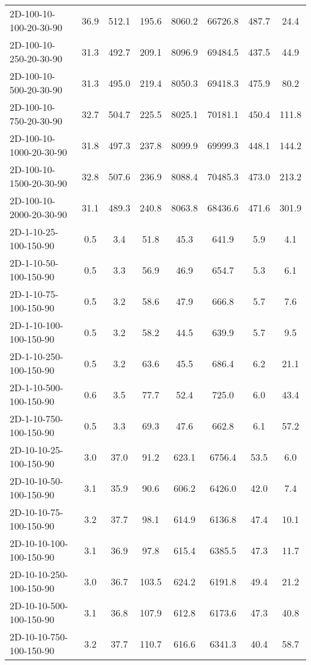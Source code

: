 \documentclass{article}
\begin{document}
\begin{center}
\begin{table}[h]
\begin{tabular}{|l||c|c|c|c|c|c|c|}
        2D-100-10-100-20-30-90 & 36.9 & 512.1 & 195.6 & 8060.2 & 66726.8 & 487.7 & 24.4 \\
        2D-100-10-250-20-30-90 & 31.3 & 492.7 & 209.1 & 8096.9 & 69484.5 & 437.5 & 44.9 \\
        2D-100-10-500-20-30-90 & 31.3 & 495.0 & 219.4 & 8050.3 & 69418.3 & 475.9 & 80.2 \\
        2D-100-10-750-20-30-90 & 32.7 & 504.7 & 225.5 & 8025.1 & 70181.1 & 450.4 & 111.8 \\
        2D-100-10-1000-20-30-90 & 31.8 & 497.3 & 237.8 & 8099.9 & 69999.3 & 448.1 & 144.2 \\
        2D-100-10-1500-20-30-90 & 32.8 & 507.6 & 236.9 & 8088.4 & 70485.3 & 473.0 & 213.2 \\
        2D-100-10-2000-20-30-90 & 31.1 & 489.3 & 240.8 & 8063.8 & 68436.6 & 471.6 & 301.9 \\
        \hline
        2D-1-10-25-100-150-90 & 0.5 & 3.4 & 51.8 & 45.3 & 641.9 & 5.9 & 4.1 \\
        2D-1-10-50-100-150-90 & 0.5 & 3.3 & 56.9 & 46.9 & 654.7 & 5.3 & 6.1 \\
        2D-1-10-75-100-150-90 & 0.5 & 3.2 & 58.6 & 47.9 & 666.8 & 5.7 & 7.6 \\
        2D-1-10-100-100-150-90 & 0.5 & 3.2 & 58.2 & 44.5 & 639.9 & 5.7 & 9.5 \\
        2D-1-10-250-100-150-90 & 0.5 & 3.2 & 63.6 & 45.5 & 686.4 & 6.2 & 21.1 \\
        2D-1-10-500-100-150-90 & 0.6 & 3.5 & 77.7 & 52.4 & 725.0 & 6.0 & 43.4 \\
        2D-1-10-750-100-150-90 & 0.5 & 3.3 & 69.3 & 47.6 & 662.8 & 6.1 & 57.2 \\
        \hline
        2D-10-10-25-100-150-90 & 3.0 & 37.0 & 91.2 & 623.1 & 6756.4 & 53.5 & 6.0 \\
        2D-10-10-50-100-150-90 & 3.1 & 35.9 & 90.6 & 606.2 & 6426.0 & 42.0 & 7.4 \\
        2D-10-10-75-100-150-90 & 3.2 & 37.7 & 98.1 & 614.9 & 6136.8 & 47.4 & 10.1 \\
        2D-10-10-100-100-150-90 & 3.1 & 36.9 & 97.8 & 615.4 & 6385.5 & 47.3 & 11.7 \\
        2D-10-10-250-100-150-90 & 3.0 & 36.7 & 103.5 & 624.2 & 6191.8 & 49.4 & 21.2 \\
        2D-10-10-500-100-150-90 & 3.1 & 36.8 & 107.9 & 612.8 & 6173.6 & 47.3 & 40.8 \\
        2D-10-10-750-100-150-90 & 3.2 & 37.7 & 110.7 & 616.6 & 6341.3 & 40.4 & 58.7 \\

\end{tabular}
\end{table}
\end{center}
\end{document}
